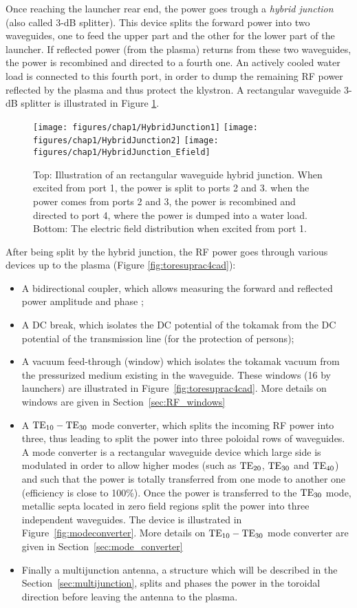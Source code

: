 Once reaching the launcher rear end, the power goes trough a \textit{hybrid junction} (also called 3-dB splitter). This device splits the forward power into two waveguides, one to feed the upper part and the other for the lower part of the launcher.  If reflected power (from the plasma) returns from these two waveguides, the power is recombined and directed to a fourth one. An actively cooled water load is connected to this fourth port, in order to dump the remaining RF power reflected by the plasma and thus protect the klystron. A rectangular waveguide 3-dB splitter is illustrated in Figure \ref{fig:hybridjunction1}. 

\begin{figure}[h]
	\centering
	\texttt{[image: figures/chap1/HybridJunction1]}
	\texttt{[image: figures/chap1/HybridJunction2]}
	\texttt{[image: figures/chap1/HybridJunction\_Efield]}
	\caption{Top: Illustration of an rectangular waveguide hybrid junction. When excited from port 1, the power is split to ports 2 and 3. when the power comes from ports 2 and 3, the power is recombined and directed to port 4, where the power is dumped into a water load. Bottom: The electric field distribution when excited from port 1. }
	\label{fig:hybridjunction1}
\end{figure}


After being split by the hybrid junction, the RF power goes through various devices up to the plasma (Figure \ref{fig:toresuprac4cad}): 
\begin{itemize}
	\item A bidirectional coupler, which allows measuring the forward and reflected power amplitude and phase ;
	\item A DC break, which isolates the DC potential of the tokamak from the DC potential of the transmission line (for the protection of persons);
	\item A vacuum feed-through (window) which isolates the tokamak vacuum from the pressurized medium existing in the waveguide. These windows (16 by launchers) are illustrated in Figure~\ref{fig:toresuprac4cad}. More details on windows are given in Section~\ref{sec:RF_windows}
	\item A ${\mathrm{TE}}_{10}-{\mathrm{TE}}_{30}$ mode converter, which splits the incoming RF power into three, thus leading to split the power into three poloidal rows of waveguides. A mode converter is a rectangular waveguide device which large side is modulated in order to allow higher modes (such as ${\mathrm{TE}}_{20}$, ${\mathrm{TE}}_{30}$ and ${\mathrm{TE}}_{40}$) and such that the power is totally transferred from one mode to another one (efficiency is close to 100\%). Once the power is transferred to the ${\mathrm{TE}}_{30}$ mode, metallic septa located in zero field regions split the power into three independent waveguides. The device is illustrated in Figure~\ref{fig:modeconverter}. More details on ${\mathrm{TE}}_{10}-{\mathrm{TE}}_{30}$ mode converter are given in Section~\ref{sec:mode_converter}
	\item Finally a multijunction antenna, a structure which will be described in the Section~\ref{sec:multijunction}, splits and phases the power in the toroidal direction before leaving the antenna to the plasma. 
\end{itemize}


